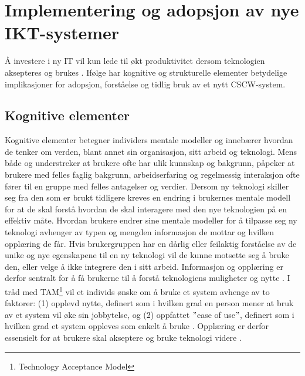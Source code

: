 \section{Implementering og adopsjon av nye IKT-systemer}
\label{sec:implementering}
Å investere i ny IT vil kun lede til økt produktivitet dersom teknologien aksepteres og brukes \citep{Venkatesh99}. Ifølge \citet{Orlikowski92} har kognitive og strukturelle elementer betydelige implikasjoner for adopsjon, forståelse og tidlig bruk av et nytt CSCW-system. 

\subsection{Kognitive elementer}
\label{sec:kognitive_elementer}
Kognitive elementer betegner individers mentale modeller og innebærer hvordan de tenker om verden, blant annet sin organisasjon, sitt arbeid og teknologi. Mens både \citet{Berg99} og \citet{Ackerman00} understreker at brukere ofte har ulik kunnskap og bakgrunn, påpeker \citet{Orlikowski92} at brukere med felles faglig bakgrunn, arbeidserfaring og regelmessig interaksjon ofte fører til en gruppe med felles antagelser og verdier. Dersom ny teknologi skiller seg fra den som er brukt tidligere kreves en endring i brukernes mentale modell for at de skal forstå hvordan de skal interagere med den nye teknologien på en effektiv måte. Hvordan brukere endrer sine mentale modeller for å tilpasse seg ny teknologi avhenger av typen og mengden informasjon de mottar og hvilken opplæring de får. Hvis brukergruppen har en dårlig eller feilaktig forståelse av de unike og nye egenskapene til en ny teknologi vil de kunne motsette seg å bruke den, eller velge å ikke integrere den i sitt arbeid. Informasjon og opplæring er derfor sentralt for å få brukerne til å forstå teknologiens muligheter og nytte \citep{Orlikowski92}. I tråd med TAM\footnote{Technology Acceptance Model} vil et individs ønske om å bruke et system avhenge av to faktorer: (1) opplevd nytte, definert som i hvilken grad en person mener at bruk av et system vil øke sin jobbytelse, og (2) oppfattet $"$ease of use$"$, definert som i hvilken grad et system oppleves som enkelt å bruke \citep{Venkatesh00}. Opplæring er derfor essensielt for at brukere skal akseptere og bruke teknologi videre \citep{Venkatesh99}.

